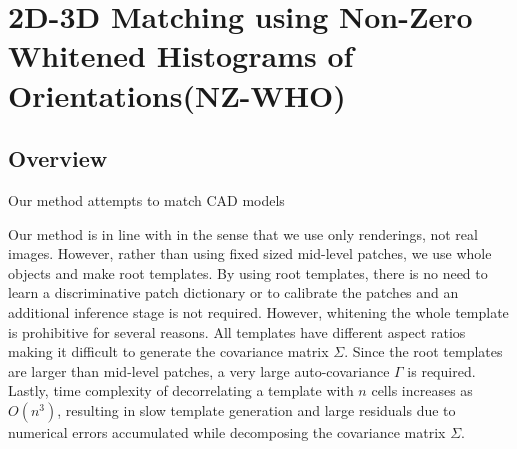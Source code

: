 \documentclass[10pt,twocolumn,letterpaper]{article}
\begin{document}

\section{2D-3D Matching using Non-Zero Whitened Histograms of Orientations(NZ-WHO)}
\label{sec:nz-who}

\subsection{Overview}
Our method attempts to match CAD models 


Our method is in line with \cite{Aubry14, Lim14} in the sense that we
use only renderings, not real images. However, rather than using fixed
sized mid-level patches, we use whole objects and make root
templates. By using root templates, there is no need to learn a
discriminative patch dictionary or to calibrate the patches and an
additional inference stage is not required. However, whitening the
whole template is prohibitive for several reasons. All templates have
different aspect ratios making it difficult to generate the covariance
matrix $\Sigma$. Since the root templates are larger than mid-level
patches, a very large auto-covariance $\Gamma$ is required. Lastly,
time complexity of decorrelating a template with $n$ cells increases
as $O(n^3)$, resulting in slow template generation and large residuals
due to numerical errors accumulated while decomposing the covariance
matrix $\Sigma$. 
\end{document}
